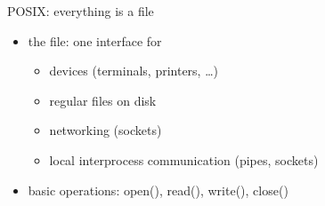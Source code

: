 \usetikzlibrary{arrows.meta,chains}

\begin{frame}{POSIX: everything is a file}
\begin{itemize}
\item the file: one interface for
    \begin{itemize}
    \item devices (terminals, printers, \ldots)
    \item regular files on disk
    \item networking (sockets)
    \item local interprocess communication (pipes, sockets)
    \end{itemize}
    \vspace{.5cm}
    \item basic operations: open(), read(), write(), close()
\end{itemize}
\end{frame}
